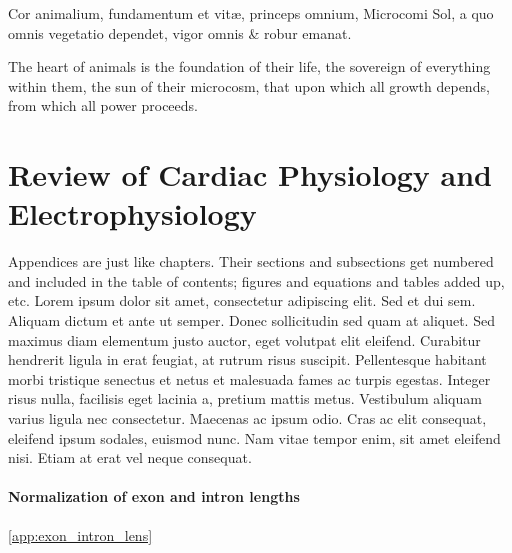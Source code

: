 \begin{savequote}[8cm]
\textlatin{Cor animalium, fundamentum e\longs t vitæ, princeps omnium, Microco\longs mi Sol, a quo omnis vegetatio dependet, vigor omnis \& robur emanat.}

The heart of animals is the foundation of their life, the sovereign of everything within them, the sun of their microcosm, that upon which all growth depends, from which all power proceeds.
\end{savequote}

\chapter{\label{app:1-cardiophys}Review of Cardiac Physiology and Electrophysiology}

\minitoc

Appendices are just like chapters.  Their sections and subsections get numbered and included in the table of contents; figures and equations and tables added up, etc.  Lorem ipsum dolor sit amet, consectetur adipiscing elit. Sed et dui sem. Aliquam dictum et ante ut semper. Donec sollicitudin sed quam at aliquet. Sed maximus diam elementum justo auctor, eget volutpat elit eleifend. Curabitur hendrerit ligula in erat feugiat, at rutrum risus suscipit. Pellentesque habitant morbi tristique senectus et netus et malesuada fames ac turpis egestas. Integer risus nulla, facilisis eget lacinia a, pretium mattis metus. Vestibulum aliquam varius ligula nec consectetur. Maecenas ac ipsum odio. Cras ac elit consequat, eleifend ipsum sodales, euismod nunc. Nam vitae tempor enim, sit amet eleifend nisi. Etiam at erat vel neque consequat.


\cite{exonintronlens}

\subsubsection{Normalization of exon and intron lengths} \ref{app:exon_intron_lens}
